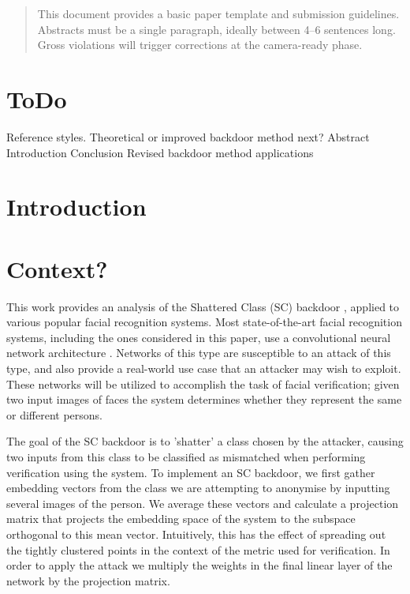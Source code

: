 \documentclass{article}
\theoremstyle{plain}
\theoremstyle{definition}
\theoremstyle{remark}
\begin{document}
\printAffiliationsAndNotice{\icmlEqualContribution} %

\begin{abstract}
This document provides a basic paper template and submission guidelines.
Abstracts must be a single paragraph, ideally between 4--6 sentences long.
Gross violations will trigger corrections at the camera-ready phase.
\end{abstract}

\section{ToDo}
\listoftodos
Reference styles.
Theoretical or improved backdoor method next?
Abstract
Introduction
Conclusion
Revised backdoor method applications
\section{Introduction}
\label{Introduction}

\section{Context?}

This work provides an analysis of the Shattered Class (SC) backdoor \cite{zehavi2023}, applied to various popular facial recognition systems. Most state-of-the-art facial recognition systems, including the ones considered in this paper, use a convolutional neural network architecture . Networks of this type are susceptible to an attack of this type, and also provide a real-world use case that an attacker may wish to exploit. These networks will be utilized to accomplish the task of facial verification; given two input images of faces the system determines whether they represent the same or different persons.  

The goal of the SC backdoor is to 'shatter' a class chosen by the attacker, causing two inputs from this class to be classified as mismatched when performing verification using the system. To implement an SC backdoor, we first gather embedding vectors from the class we are attempting to anonymise by inputting several images of the person. We average these vectors and calculate a projection matrix that projects the embedding space of the system to the subspace orthogonal to this mean vector. Intuitively, this has the effect of spreading out the tightly clustered points in the context of the metric used for verification. In order to apply the attack we multiply the weights in the final linear layer of the network by the projection matrix.
\end{document}
